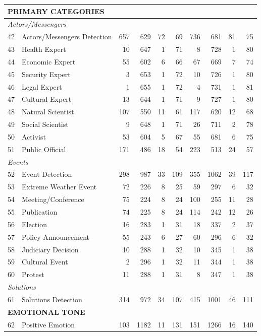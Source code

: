 \documentclass[12pt]{article}
\begin{document}
{\begin{longtable}{p{0.5cm}p{5.5cm}rrrrrrrr}
\multicolumn{10}{l}{\cellcolor{gray!10}\textbf{PRIMARY CATEGORIES}} \\
\midrule
\multicolumn{10}{l}{\textit{Actors/Messengers}} \\
42 & Actors/Messengers Detection & 657 & 629 & 72 & 69 & 736 & 681 & 81 & 75 \\
43 & Health Expert & 10 & 647 & 1 & 71 & 8 & 728 & 1 & 80 \\
44 & Economic Expert & 55 & 602 & 6 & 66 & 67 & 669 & 7 & 74 \\
45 & Security Expert & 3 & 653 & 1 & 72 & 10 & 726 & 1 & 80 \\
46 & Legal Expert & 1 & 655 & 1 & 72 & 4 & 731 & 1 & 81 \\
47 & Cultural Expert & 13 & 644 & 1 & 71 & 9 & 727 & 1 & 80 \\
48 & Natural Scientist & 107 & 550 & 11 & 61 & 117 & 620 & 12 & 68 \\
49 & Social Scientist & 9 & 648 & 1 & 71 & 26 & 711 & 2 & 78 \\
50 & Activist & 53 & 604 & 5 & 67 & 55 & 681 & 6 & 75 \\
51 & Public Official & 171 & 486 & 18 & 54 & 223 & 513 & 24 & 57 \\
\multicolumn{10}{l}{\textit{Events}} \\
52 & Event Detection & 298 & 987 & 33 & 109 & 355 & 1062 & 39 & 117 \\
53 & Extreme Weather Event & 72 & 226 & 8 & 25 & 59 & 297 & 6 & 32 \\
54 & Meeting/Conference & 75 & 224 & 8 & 24 & 100 & 255 & 11 & 28 \\
55 & Publication & 74 & 225 & 8 & 24 & 114 & 242 & 12 & 26 \\
56 & Election & 16 & 283 & 1 & 31 & 18 & 337 & 2 & 37 \\
57 & Policy Announcement & 55 & 243 & 6 & 27 & 60 & 296 & 6 & 32 \\
58 & Judiciary Decision & 10 & 288 & 1 & 32 & 10 & 345 & 1 & 38 \\
59 & Cultural Event & 2 & 296 & 1 & 32 & 11 & 344 & 1 & 38 \\
60 & Protest & 11 & 288 & 1 & 31 & 8 & 347 & 1 & 38 \\
\multicolumn{10}{l}{\textit{Solutions}} \\
61 & Solutions Detection & 314 & 972 & 34 & 107 & 415 & 1001 & 46 & 111 \\
\multicolumn{10}{l}{\cellcolor{gray!10}\textbf{EMOTIONAL TONE}} \\
\midrule
62 & Positive Emotion & 103 & 1182 & 11 & 131 & 151 & 1266 & 16 & 140 \\

\end{longtable}}
\end{document}

